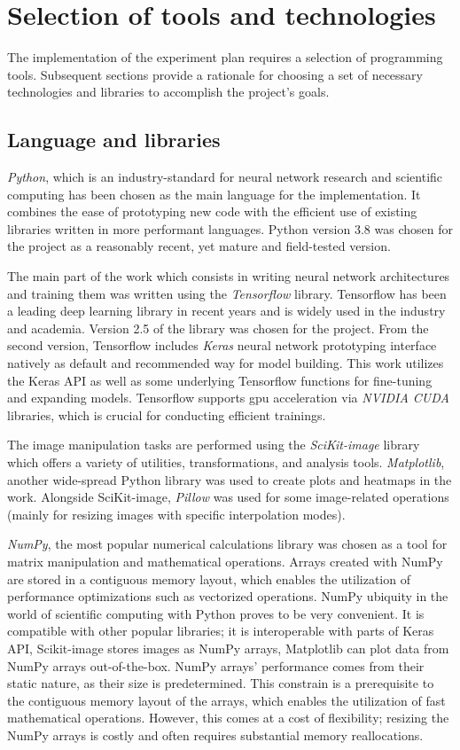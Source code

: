 \section{Selection of tools and technologies}
The implementation of the experiment plan requires a selection of programming tools.
Subsequent sections provide a rationale for choosing a set of necessary technologies and libraries to accomplish the project's goals.

\subsection{Language and libraries}
\textit{Python}, which is an industry-standard for neural network research and scientific computing has been chosen as the main language for the implementation.
It combines the ease of prototyping new code with the efficient use of existing libraries written in more performant languages.
Python version 3.8 was chosen for the project as a reasonably recent, yet mature and field-tested version.

The main part of the work which consists in writing neural network architectures and training them was written using the \textit{Tensorflow} library.
Tensorflow has been a leading deep learning library in recent years and is widely used in the industry and academia.
Version 2.5 of the library was chosen for the project.
From the second version, Tensorflow includes \textit{Keras} neural network prototyping interface natively as default and recommended way for model building.
This work utilizes the Keras API as well as some underlying Tensorflow functions for fine-tuning and expanding models.
Tensorflow supports \gls{gpu} acceleration via \textit{NVIDIA CUDA} libraries, which is crucial for conducting efficient trainings.

The image manipulation tasks are performed using the \textit{SciKit-image} library which offers a variety of utilities, transformations, and analysis tools.
\textit{Matplotlib}, another wide-spread Python library was used to create plots and heatmaps in the work.
Alongside SciKit-image, \textit{Pillow} was used for some image-related operations (mainly for resizing images with specific interpolation modes).

\textit{NumPy}, the most popular numerical calculations library was chosen as a tool for matrix manipulation and mathematical operations.
Arrays created with NumPy are stored in a contiguous memory layout, which enables the utilization of performance optimizations such as vectorized operations. 
NumPy ubiquity in the world of scientific computing with Python proves to be very convenient.
It is compatible with other popular libraries; it is interoperable with parts of Keras API, Scikit-image stores images as NumPy arrays, Matplotlib can plot data from NumPy arrays out-of-the-box.
NumPy arrays' performance comes from their static nature, as their size is predetermined.
This constrain is a prerequisite to the contiguous memory layout of the arrays, which enables the utilization of fast mathematical operations.
However, this comes at a cost of flexibility; resizing the NumPy arrays is costly and often requires substantial memory reallocations.

